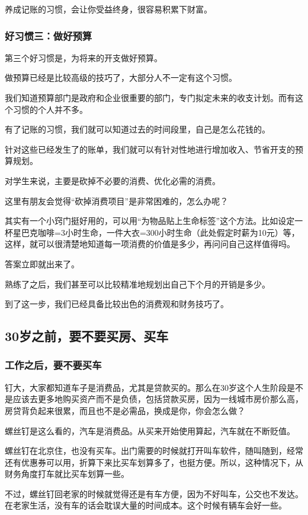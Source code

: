 养成记账的习惯，会让你受益终身，很容易积累下财富。

\subsubsection{好习惯三：做好预算}

第三个好习惯是，为将来的开支做好预算。

做预算已经是比较高级的技巧了，大部分人不一定有这个习惯。

我们知道预算部门是政府和企业很重要的部门，专门拟定未来的收支计划。而有这个习惯的个人并不多。

有了记账的习惯，我们就可以知道过去的时间段里，自己是怎么花钱的。

针对这些已经发生了的账单，我们就可以有针对性地进行增加收入、节省开支的预算规划。

对学生来说，主要是砍掉不必要的消费、优化必需的消费。

这里有朋友会觉得“砍掉消费项目”是非常困难的，怎么办呢？

其实有一个小窍门挺好用的，可以用“为物品贴上生命标签”这个方法。比如设定一杯星巴克咖啡=3小时生命，一件大衣=300小时生命（此处假定时薪为10元）等，这样，就可以很清楚地知道每一项消费的价值是多少，再问问自己这样值得吗。

答案立即就出来了。

熟练了之后，我们甚至可以比较精准地规划出自己下个月的开销是多少。

到了这一步，我们已经具备比较出色的消费观和财务技巧了。

\subsection{30岁之前，要不要买房、买车}
\subsubsection{工作之后，要不要买车}

{\kaishu 钉大，大家都知道车子是消费品，尤其是贷款买的。那么在30岁这个人生阶段是不是应该去更多地购买资产而不是负债，包括贷款买房，因为一线城市房价那么高，房贷背负起来很累，而且也不是必需品，换成是你，你会怎么做？}

螺丝钉是这么看的，汽车是消费品。从买来开始使用算起，汽车就在不断贬值。

螺丝钉在北京住，也没有买车。出门需要的时候就打开叫车软件，随叫随到，经常还有优惠券可以用，折算下来比买车划算多了，也挺方便。所以，这种情况下，从财务角度打车就比买车划算一些。

不过，螺丝钉回老家的时候就觉得还是有车方便，因为不好叫车，公交也不发达。在老家生活，没有车的话会耽误大量的时间成本。这个时候有辆车会好一些。

